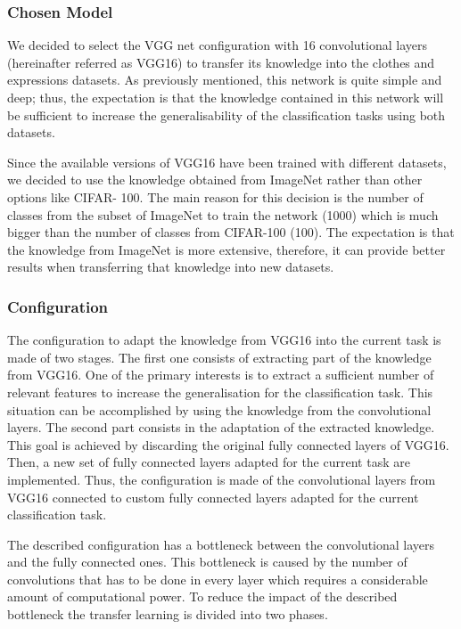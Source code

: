 \documentclass{article}
\begin{document}
\subsubsection{\textbf{Chosen Model}}

We decided to select the VGG net configuration with 16 convolutional layers (hereinafter referred as VGG16) to transfer its knowledge into the clothes and expressions datasets. As previously mentioned, this network is quite simple and deep; thus, the expectation is that the knowledge contained in this network will be sufficient to increase the generalisability of the classification tasks using both datasets.

Since the available versions of VGG16 have been trained with different datasets, we decided to use the knowledge obtained from ImageNet rather than other options like CIFAR- 100. The main reason for this decision is the number of classes from the subset of ImageNet to train the network (1000) which is much bigger than the number of classes from CIFAR-100 (100). The expectation is that the knowledge from ImageNet is more extensive, therefore, it can provide better results when transferring that knowledge into new datasets.

\subsubsection{\textbf{Configuration}}

The configuration to adapt the knowledge from VGG16 into the current task is made of two stages. The first one consists of extracting part of the knowledge from VGG16. One of the primary interests is to extract a sufficient number of relevant features to increase the generalisation for the classification task. This situation can be accomplished by using the knowledge from the convolutional layers. The second part consists in the adaptation of the extracted knowledge. This goal is achieved by discarding the original fully connected layers of VGG16. Then, a new set of fully connected layers adapted for the current task are implemented. Thus, the configuration is made of the convolutional layers from VGG16 connected to custom fully connected layers adapted for the current classification task.

The described configuration has a bottleneck between the convolutional layers and the fully connected ones. This bottleneck is caused by the number of convolutions that has to be done in every layer which requires a considerable amount of computational power. To reduce the impact of the described bottleneck the transfer learning is divided into two phases.
\end{document}

